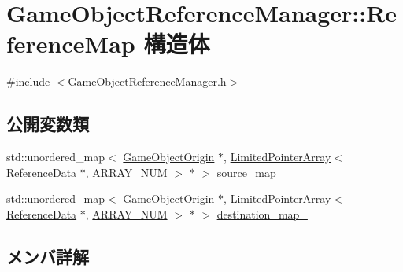 \hypertarget{struct_game_object_reference_manager_1_1_reference_map}{}\section{Game\+Object\+Reference\+Manager\+:\+:Reference\+Map 構造体}
\label{struct_game_object_reference_manager_1_1_reference_map}


{\ttfamily \#include $<$Game\+Object\+Reference\+Manager.\+h$>$}

\subsection*{公開変数類}
\begin{DoxyCompactItemize}
\item 
std\+::unordered\+\_\+map$<$ \mbox{\hyperlink{class_game_object_origin}{Game\+Object\+Origin}} $\ast$, \mbox{\hyperlink{class_limited_pointer_array}{Limited\+Pointer\+Array}}$<$ \mbox{\hyperlink{struct_game_object_reference_manager_1_1_reference_data}{Reference\+Data}} $\ast$, \mbox{\hyperlink{class_game_object_reference_manager_a962d30b10c5b76353645773b2c1740ce}{A\+R\+R\+A\+Y\+\_\+\+N\+UM}} $>$ $\ast$ $>$ \mbox{\hyperlink{struct_game_object_reference_manager_1_1_reference_map_a0ee4351e9e65be2e72a47a97dc116af3}{source\+\_\+map\+\_\+}}
\item 
std\+::unordered\+\_\+map$<$ \mbox{\hyperlink{class_game_object_origin}{Game\+Object\+Origin}} $\ast$, \mbox{\hyperlink{class_limited_pointer_array}{Limited\+Pointer\+Array}}$<$ \mbox{\hyperlink{struct_game_object_reference_manager_1_1_reference_data}{Reference\+Data}} $\ast$, \mbox{\hyperlink{class_game_object_reference_manager_a962d30b10c5b76353645773b2c1740ce}{A\+R\+R\+A\+Y\+\_\+\+N\+UM}} $>$ $\ast$ $>$ \mbox{\hyperlink{struct_game_object_reference_manager_1_1_reference_map_a03aebc5653a3ac57e7f44dfa4173378b}{destination\+\_\+map\+\_\+}}
\end{DoxyCompactItemize}


\subsection{メンバ詳解}
\mbox{\label{struct_game_object_reference_manager_1_1_reference_map_a03aebc5653a3ac57e7f44dfa4173378b}} 
